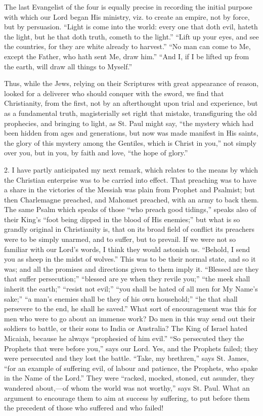 The last Evangelist of the four is equally precise in recording the
initial purpose with which our Lord began His ministry, viz. to create
an empire, not by force, but by persuasion. ``Light is come into
the world: every one that doth evil, hateth the light, but he that
doth truth, cometh to the light.'' ``Lift up your eyes, and
see the countries, for they are white already to harvest.''
``No man can come to Me, except the Father, who hath sent Me, draw
him.'' ``And I, if I be lifted up from the earth, will draw
all things to Myself.''

Thus, while the Jews, relying on their Scriptures with great
appearance of reason, looked for a deliverer who should conquer with
the sword, we find that Christianity, from the first, not by an
afterthought upon trial and experience, but as a fundamental
truth, magisterially set right that mistake, transfiguring the old
prophecies, and bringing to light, as St. Paul might say, ``the
mystery which had been hidden from ages and generations, but now was
made manifest in His saints, the glory of this mystery among the
Gentiles, which is Christ in you,'' not simply over you, but in
you, by faith and love, ``the hope of glory.''

2. I have partly anticipated my next remark, which relates to the
means by which the Christian enterprise was to be carried into effect.
That preaching was to have a share in the victories of the Messiah was
plain from Prophet and Psalmist; but then Charlemagne preached, and
Mahomet preached, with an army to back them. The same Psalm which
speaks of those ``who preach good tidings,'' speaks also of
their King's ``foot being dipped in the blood of His
enemies;'' but what is so grandly original in Christianity is,
that on its broad field of conflict its preachers were to be simply
unarmed, and to suffer, but to prevail. If we were not so familiar
with our Lord's words, I think they would astonish us. ``Behold, I
send you as sheep in the midst of wolves.'' This was to be their
normal state, and so it was; and all the promises and directions given
to them imply it. ``Blessed are they that suffer
persecution;'' ``blessed are ye when they revile you;''
``the meek shall inherit the earth;'' ``resist not
evil;'' ``you shall be hated of all men for My Name's
sake;'' ``a man's enemies shall be they of his own
household;'' ``he that shall persevere to the end, he shall he
saved.'' What sort of encouragement was this for men who were
to go about an immense work? Do men in this way send out their
soldiers to battle, or their sons to India or Australia? The King of
Israel hated Micaiah, because he always ``prophesied of him
evil.'' ``So persecuted they the Prophets that were before
you,'' says our Lord. Yes, and the Prophets failed; they were
persecuted and they lost the battle. ``Take, my brethren,''
says St. James, ``for an example of suffering evil, of labour and
patience, the Prophets, who spake in the Name of the Lord.'' They
were ``racked, mocked, stoned, cut asunder, they wandered about,—of
whom the world was not worthy,'' says St. Paul. What an argument
to encourage them to aim at success by suffering, to put before them
the precedent of those who suffered and who failed!

